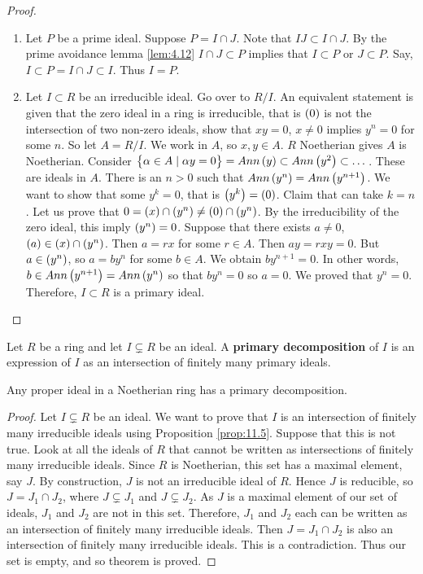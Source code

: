 \begin{proof}
\hfill
\begin{enumerate}
\item Let $ P $ be a prime ideal. Suppose $ P = I \cap J $. Note that $ IJ \subset I \cap J $. By the prime avoidance lemma \ref{lem:4.12} $ I \cap J \subset P $ implies that $ I \subset P $ or $ J \subset P $. Say, $ I \subset P = I \cap J \subset I $. Thus $ I = P $.
\item Let $ I \subset R $ be an irreducible ideal. Go over to $ R / I $. An equivalent statement is given that the zero ideal in a ring is irreducible, that is $ \br{0} $ is not the intersection of two non-zero ideals, show that $ xy = 0 $, $ x \ne 0 $ implies $ y^n = 0 $ for some $ n $. So let $ A = R / I $. We work in $ A $, so $ x, y \in A $. $ R $ Noetherian gives $ A $ is Noetherian. Consider $ \cbr{\alpha \in A \mid \alpha y = 0} = Ann\br{y} \subset Ann\br{y^2} \subset \dots $. These are ideals in $ A $. There is an $ n > 0 $ such that $ Ann\br{y^n} = Ann\br{y^{n + 1}} $. We want to show that some $ y^k = 0 $, that is $ \br{y^k} = \br{0} $. Claim that can take $ k = n $. Let us prove that $ 0 = \br{x} \cap \br{y^n} \ne \br{0} \cap \br{y^n} $. By the irreducibility of the zero ideal, this imply $ \br{y^n} = 0 $. Suppose that there exists $ a \ne 0 $, $ \br{a} \in \br{x} \cap \br{y^n} $. Then $ a = rx $ for some $ r \in A $. Then $ ay = rxy = 0 $. But $ a \in \br{y^n} $, so $ a = by^n $ for some $ b \in A $. We obtain $ by^{n + 1} = 0 $. In other words, $ b \in Ann\br{y^{n + 1}} = Ann\br{y^n} $ so that $ by^n = 0 $ so $ a = 0 $. We proved that $ y^n = 0 $. Therefore, $ I \subset R $ is a primary ideal.
\end{enumerate}
\end{proof}

Let $ R $ be a ring and let $ I \subsetneq R $ be an ideal. A \textbf{primary decomposition} of $ I $ is an expression of $ I $ as an intersection of finitely many primary ideals.

\begin{theorem}[Noether]
Any proper ideal in a Noetherian ring has a primary decomposition.
\end{theorem}

\begin{proof}
Let $ I \subsetneq R $ be an ideal. We want to prove that $ I $ is an intersection of finitely many irreducible ideals using Proposition \ref{prop:11.5}. Suppose that this is not true. Look at all the ideals of $ R $ that cannot be written as intersections of finitely many irreducible ideals. Since $ R $ is Noetherian, this set has a maximal element, say $ J $. By construction, $ J $ is not an irreducible ideal of $ R $. Hence $ J $ is reducible, so $ J = J_1 \cap J_2 $, where $ J \subsetneq J_1 $ and $ J \subsetneq J_2 $. As $ J $ is a maximal element of our set of ideals, $ J_1 $ and $ J_2 $ are not in this set. Therefore, $ J_1 $ and $ J_2 $ each can be written as an intersection of finitely many irreducible ideals. Then $ J = J_1 \cap J_2 $ is also an intersection of finitely many irreducible ideals. This is a contradiction. Thus our set is empty, and so theorem is proved.
\end{proof}

